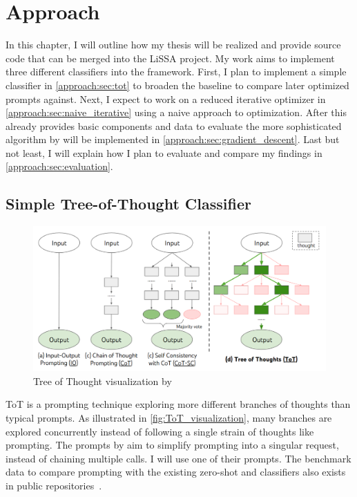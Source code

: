 \chapter{Approach}
In this chapter, I will outline how my thesis will be realized and provide source code that can be merged into the LiSSA project.
My work aims to implement three different classifiers into the framework.
First, I plan to implement a simple \ToT classifier in \autoref{approach:sec:tot} to broaden the baseline to compare later optimized prompts against.
Next, I expect to work on a reduced iterative optimizer in \autoref{approach:sec:naive_iterative} using a naive approach to optimization.
After this already provides basic components and data to evaluate the more sophisticated algorithm by  will be implemented in \autoref{approach:sec:gradient_descent}.
Last but not least, I will explain how I plan to evaluate and compare my findings in \autoref{approach:sec:evaluation}.

\section{Simple Tree-of-Thought Classifier}
\label{approach:sec:tot}

\begin{figure}
    \centering
    \includegraphics[width=\linewidth]{graphics/ToT_Yao}
    \caption{Tree of Thought visualization by }
    \label{fig:ToT_visualization}
\end{figure}

\Ac{ToT} is a prompting technique exploring more different branches of thoughts than typical \CoT prompts.
As illustrated in \autoref{fig:ToT_visualization}, many branches are explored concurrently instead of following a single strain of thoughts like \CoT prompting.
The prompts by  aim to simplify \ToT prompting into a singular request, instead of chaining multiple calls.
I will use one of their prompts.
The benchmark data to compare \ToT prompting with the existing zero-shot and \CoT classifiers also exists in public repositories~\cite{fuchss2022ArDoCoBenchmark, hey2025ReplicationPackage}.

